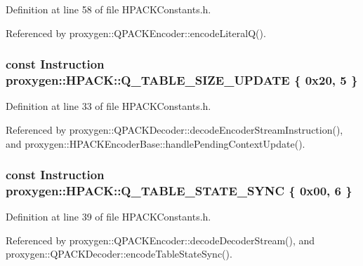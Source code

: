 Definition at line 58 of file H\+P\+A\+C\+K\+Constants.\+h.



Referenced by proxygen\+::\+Q\+P\+A\+C\+K\+Encoder\+::encode\+Literal\+Q().

\subsubsection[{Q\+\_\+\+T\+A\+B\+L\+E\+\_\+\+S\+I\+Z\+E\+\_\+\+U\+P\+D\+A\+TE}]{\setlength{\rightskip}{0pt plus 5cm}const {\bf Instruction} proxygen\+::\+H\+P\+A\+C\+K\+::\+Q\+\_\+\+T\+A\+B\+L\+E\+\_\+\+S\+I\+Z\+E\+\_\+\+U\+P\+D\+A\+TE \{ 0x20, 5 \}}\label{namespaceproxygen_1_1HPACK_a8ee3e37be3f409cbf92919b444b24a13}


Definition at line 33 of file H\+P\+A\+C\+K\+Constants.\+h.



Referenced by proxygen\+::\+Q\+P\+A\+C\+K\+Decoder\+::decode\+Encoder\+Stream\+Instruction(), and proxygen\+::\+H\+P\+A\+C\+K\+Encoder\+Base\+::handle\+Pending\+Context\+Update().

\subsubsection[{Q\+\_\+\+T\+A\+B\+L\+E\+\_\+\+S\+T\+A\+T\+E\+\_\+\+S\+Y\+NC}]{\setlength{\rightskip}{0pt plus 5cm}const {\bf Instruction} proxygen\+::\+H\+P\+A\+C\+K\+::\+Q\+\_\+\+T\+A\+B\+L\+E\+\_\+\+S\+T\+A\+T\+E\+\_\+\+S\+Y\+NC \{ 0x00, 6 \}}\label{namespaceproxygen_1_1HPACK_a60a184aeb2861ed82ec97724da9a1d41}


Definition at line 39 of file H\+P\+A\+C\+K\+Constants.\+h.



Referenced by proxygen\+::\+Q\+P\+A\+C\+K\+Encoder\+::decode\+Decoder\+Stream(), and proxygen\+::\+Q\+P\+A\+C\+K\+Decoder\+::encode\+Table\+State\+Sync().

